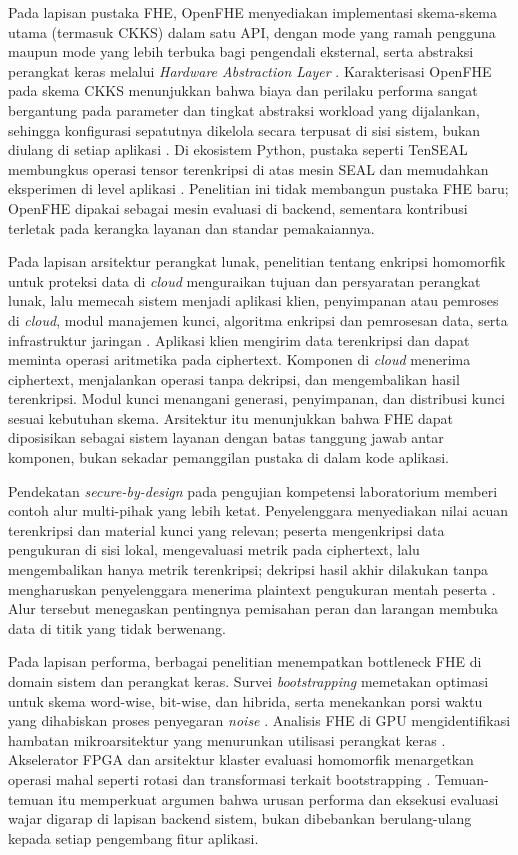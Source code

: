 \documentclass[12pt,a4paper,oneside]{report}
\begin{document}
Pada lapisan pustaka FHE, OpenFHE menyediakan implementasi skema-skema utama (termasuk CKKS) dalam satu API, dengan mode yang ramah pengguna maupun mode yang lebih terbuka bagi pengendali eksternal, serta abstraksi perangkat keras melalui \emph{Hardware Abstraction Layer} \cite{badawi2022openfhe}. Karakterisasi OpenFHE pada skema CKKS menunjukkan bahwa biaya dan perilaku performa sangat bergantung pada parameter dan tingkat abstraksi workload yang dijalankan, sehingga konfigurasi sepatutnya dikelola secara terpusat di sisi sistem, bukan diulang di setiap aplikasi \cite{brynds2025cryptoracle}. Di ekosistem Python, pustaka seperti TenSEAL membungkus operasi tensor terenkripsi di atas mesin SEAL dan memudahkan eksperimen di level aplikasi \cite{benaissa2021tenseal}. Penelitian ini tidak membangun pustaka FHE baru; OpenFHE dipakai sebagai mesin evaluasi di backend, sementara kontribusi terletak pada kerangka layanan dan standar pemakaiannya.

Pada lapisan arsitektur perangkat lunak, penelitian tentang enkripsi homomorfik untuk proteksi data di \emph{cloud} menguraikan tujuan dan persyaratan perangkat lunak, lalu memecah sistem menjadi aplikasi klien, penyimpanan atau pemroses di \emph{cloud}, modul manajemen kunci, algoritma enkripsi dan pemrosesan data, serta infrastruktur jaringan \cite{epishkina2025cloudHeArchitecture}. Aplikasi klien mengirim data terenkripsi dan dapat meminta operasi aritmetika pada ciphertext. Komponen di \emph{cloud} menerima ciphertext, menjalankan operasi tanpa dekripsi, dan mengembalikan hasil terenkripsi. Modul kunci menangani generasi, penyimpanan, dan distribusi kunci sesuai kebutuhan skema. Arsitektur itu menunjukkan bahwa FHE dapat diposisikan sebagai sistem layanan dengan batas tanggung jawab antar komponen, bukan sekadar pemanggilan pustaka di dalam kode aplikasi.

Pendekatan \emph{secure-by-design} pada pengujian kompetensi laboratorium memberi contoh alur multi-pihak yang lebih ketat. Penyelenggara menyediakan nilai acuan terenkripsi dan material kunci yang relevan; peserta mengenkripsi data pengukuran di sisi lokal, mengevaluasi metrik pada ciphertext, lalu mengembalikan hanya metrik terenkripsi; dekripsi hasil akhir dilakukan tanpa mengharuskan penyelenggara menerima plaintext pengukuran mentah peserta \cite{vinko2026secureByDesign}. Alur tersebut menegaskan pentingnya pemisahan peran dan larangan membuka data di titik yang tidak berwenang.

Pada lapisan performa, berbagai penelitian menempatkan bottleneck FHE di domain sistem dan perangkat keras. Survei \emph{bootstrapping} memetakan optimasi untuk skema word-wise, bit-wise, dan hibrida, serta menekankan porsi waktu yang dihabiskan proses penyegaran \emph{noise} \cite{li2026bootstrappingSurvey}. Analisis FHE di GPU mengidentifikasi hambatan mikroarsitektur yang menurunkan utilisasi perangkat keras \cite{fan2026gpuFhe}. Akselerator FPGA dan arsitektur klaster evaluasi homomorfik menargetkan operasi mahal seperti rotasi dan transformasi terkait bootstrapping \cite{xu2026heraFpga,lee2025clusterFhe}. Temuan-temuan itu memperkuat argumen bahwa urusan performa dan eksekusi evaluasi wajar digarap di lapisan backend sistem, bukan dibebankan berulang-ulang kepada setiap pengembang fitur aplikasi.
\end{document}
